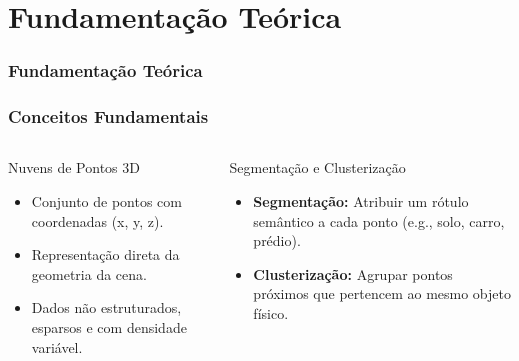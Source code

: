 \documentclass[aspectratio=169,t,xcolor=table]{beamer}
\begin{document}
\section{Fundamentação Teórica}

\begin{frame}
    \frametitle{Fundamentação Teórica}
\end{frame}

\begin{frame}
    \frametitle{Conceitos Fundamentais}
    \begin{columns}[T]
        \begin{column}{.5\textwidth}
            \begin{block}{Nuvens de Pontos 3D}
                \begin{itemize}
                    \item<+-> Conjunto de pontos com coordenadas (x, y, z).
                    \item<+-> Representação direta da geometria da cena.
                    \item<+-> Dados não estruturados, esparsos e com densidade variável.
                \end{itemize}
            \end{block}
        \end{column}
        \begin{column}{.5\textwidth}
            \begin{block}{Segmentação e Clusterização}
                \begin{itemize}
                    \item<+-> \textbf{Segmentação:} Atribuir um rótulo semântico a cada ponto (e.g., solo, carro, prédio).
                    \item<+-> \textbf{Clusterização:} Agrupar pontos próximos que pertencem ao mesmo objeto físico.
                \end{itemize}
            \end{block}
        \end{column}
    \end{columns}
\end{frame}
\end{document}

